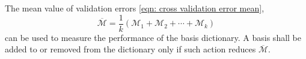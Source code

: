 The mean value of validation errors \eqref{eqn: cross validation error mean},
\begin{equation*}
    \overline{\mathcal{M}} = \frac{1}{k}\left(\mathcal{M}_1 + \mathcal{M}_2 + \cdots 
    + \mathcal{M}_k\right)
\end{equation*}
can be used to measure the performance of the basis dictionary. A basis shall be added to or removed from
the dictionary only if such action reduces $\overline{\mathcal{M}}$.\\


